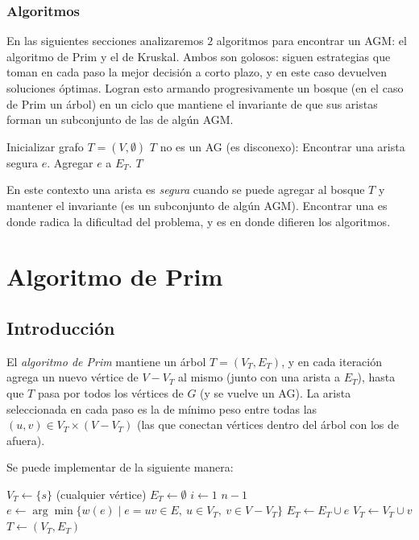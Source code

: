 \documentclass[a4paper]{report}
\begin{document}
\subsubsection{Algoritmos}

En las siguientes secciones analizaremos $2$ algoritmos para encontrar un AGM: el algoritmo de Prim y el de Kruskal. Ambos son golosos: siguen estrategias que toman en cada paso la mejor decisión a corto plazo, y en este caso devuelven soluciones óptimas. Logran esto armando progresivamente un bosque (en el caso de Prim un árbol) en un ciclo que mantiene el invariante de que sus aristas forman un subconjunto de las de algún AGM.

\begin{codebox}
    \li Inicializar grafo $T = (V, \emptyset)$
    \li \While $T$ no es un AG (es disconexo): \Do
    \li Encontrar una arista segura $e$.
    \li Agregar $e$ a $E_T$.
    \End
    \li \Return $T$
\end{codebox}

\label{arista-segura}
En este contexto una arista es \textit{segura} cuando se puede agregar al bosque $T$ y mantener el invariante (es un subconjunto de algún AGM). Encontrar una es donde radica la dificultad del problema, y es en donde difieren los algoritmos.

\section{Algoritmo de Prim}

\subsection{Introducción}

El \textit{algoritmo de Prim} mantiene un árbol $T = (V_T, E_T)$, y en cada iteración agrega un nuevo vértice de $V - V_T$ al mismo (junto con una arista a $E_T$), hasta que $T$ pasa por todos los vértices de $G$ (y se vuelve un AG). La arista seleccionada en cada paso es la de mínimo peso entre todas las $(u, v) \in V_T \times (V - V_T)$ (las que conectan vértices dentro del árbol con los de afuera).

Se puede implementar de la siguiente manera:

\begin{codebox}
    \li $V_T \gets \{s\}$ (cualquier vértice)
    \li $E_T \gets \emptyset$
    \li \For $i \gets 1$ \To $n - 1$ \Do
    \li $e \gets \arg\min{\{w(e) \mid e = uv \in E,\ u \in V_T,\ v \in V - V_T\}}$
    \li $E_T \gets E_T \cup e$
    \li $V_T \gets V_T \cup v$
    \End
    \li \Return $T \gets (V_T, E_T)$
\end{codebox}
\end{document}
